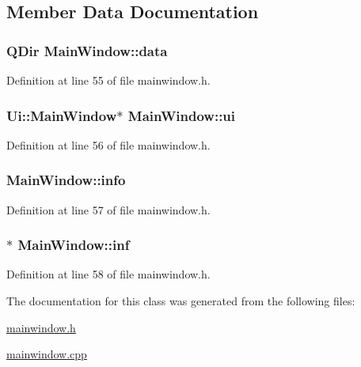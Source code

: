\subsection{Member Data Documentation}
\hypertarget{class_main_window_a1dc35bda22acc11636be809539ab73d9}{
\subsubsection[{data}]{\setlength{\rightskip}{0pt plus 5cm}Q\+Dir Main\+Window\+::data\hspace{0.3cm}{\ttfamily [private]}}}\label{class_main_window_a1dc35bda22acc11636be809539ab73d9}


Definition at line 55 of file mainwindow.\+h.

\hypertarget{class_main_window_a35466a70ed47252a0191168126a352a5}{
\subsubsection[{ui}]{\setlength{\rightskip}{0pt plus 5cm}Ui\+::\+Main\+Window$\ast$ Main\+Window\+::ui\hspace{0.3cm}{\ttfamily [private]}}}\label{class_main_window_a35466a70ed47252a0191168126a352a5}


Definition at line 56 of file mainwindow.\+h.

\hypertarget{class_main_window_a2d1f101eed410e692b5db9b7226174bf}{
\subsubsection[{info}]{ Main\+Window\+::info\hspace{0.3cm}{\ttfamily [private]}}}\label{class_main_window_a2d1f101eed410e692b5db9b7226174bf}


Definition at line 57 of file mainwindow.\+h.

\hypertarget{class_main_window_ad84bd8f23d732609dc5a01cbe3ae21de}{
\subsubsection[{inf}]{$\ast$ Main\+Window\+::inf\hspace{0.3cm}{\ttfamily [private]}}}\label{class_main_window_ad84bd8f23d732609dc5a01cbe3ae21de}


Definition at line 58 of file mainwindow.\+h.



The documentation for this class was generated from the following files\+:\begin{DoxyCompactItemize}
\item 
\hyperlink{mainwindow_8h}{mainwindow.\+h}\item 
\hyperlink{mainwindow_8cpp}{mainwindow.\+cpp}\end{DoxyCompactItemize}
